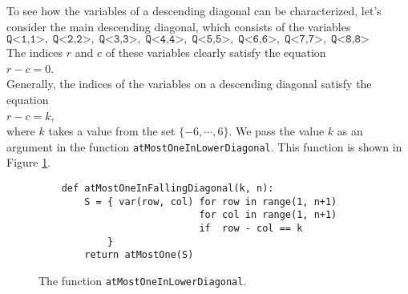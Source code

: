 To see how the variables of a descending diagonal can be characterized, let's consider the main descending diagonal, which consists of the
variables \\[0.2cm]
\hspace*{1.3cm} 
$\texttt{Q<1,1>},\; \texttt{Q<2,2>},\; \texttt{Q<3,3>},\; \texttt{Q<4,4>},\; \texttt{Q<5,5>},\; 
 \texttt{Q<6,6>},\; \texttt{Q<7,7>},\; \texttt{Q<8,8>}$ 
\\[0.2cm]
The indices $r$ and $c$ of these variables clearly satisfy
the equation \\[0.2cm]
\hspace*{1.3cm} $r - c = 0$. \\[0.2cm]
Generally, the indices of the variables on a descending diagonal satisfy the equation \\[0.2cm]
\hspace*{1.3cm} $r - c = k$, \\[0.2cm]
where $k$ takes a value from the set $\{-6, \cdots, 6 \}$. We pass the value $k$ as an argument in the
function \texttt{atMostOneInLowerDiagonal}. This function is shown in Figure
\ref{fig:atMostOneInLowerDiagonal}.

\begin{figure}[!ht]
  \centering
\begin{verbatim}
    def atMostOneInFallingDiagonal(k, n):
        S = { var(row, col) for row in range(1, n+1)
                            for col in range(1, n+1) 
                            if  row - col == k 
            }
        return atMostOne(S)
\end{verbatim}
\vspace*{-0.3cm}
  \caption{The function \texttt{atMostOneInLowerDiagonal}.}
  \label{fig:atMostOneInLowerDiagonal}
\end{figure}


